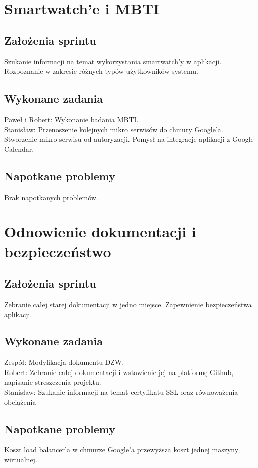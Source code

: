 \documentclass[a4paper,11pt]{report}
\begin{document}
\section {Smartwatch'e i MBTI}
\subsection {Założenia sprintu}
Szukanie informacji na temat wykorzystania smartwatch'y w aplikacji. Rozpoznanie w zakresie różnych typów użytkowników systemu. 
\subsection {Wykonane zadania}
Paweł i Robert: Wykonanie badania MBTI.\\
Stanisław: Przenoszenie kolejnych mikro serwisów do chmury Google'a. Stworzenie mikro serwisu od autoryzacji. Pomysł na integracje aplikacji z Google Calendar.\\
\subsection {Napotkane problemy}
Brak napotkanych problemów.

\section {Odnowienie dokumentacji i bezpieczeństwo}
\subsection {Założenia sprintu}
Zebranie całej starej dokumentacji w jedno miejsce. Zapewnienie bezpieczeństwa aplikacji.  
\subsection {Wykonane zadania}
Zespół: Modyfikacja dokumentu DZW.\\
Robert: Zebranie całej dokumentacji i wstawienie jej na platformę Github, napisanie streszczenia projektu.\\
Stanisław: Szukanie informacji na temat certyfikatu SSL oraz równoważenia obciążenia\\
\subsection {Napotkane problemy}
Koszt load balancer'a w chmurze Google'a przewyższa koszt jednej maszyny wirtualnej.
\end{document}
